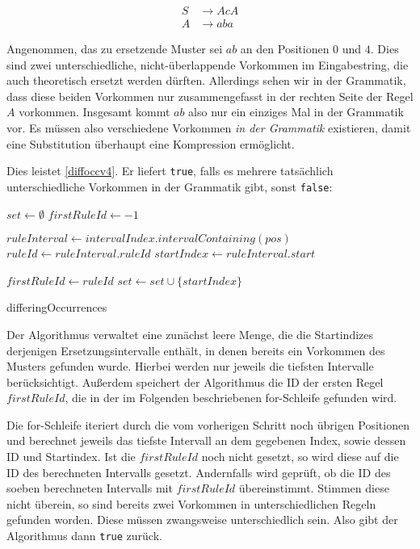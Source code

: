 \begin{align*}
    S &\rightarrow AcA\\
    A &\rightarrow aba
\end{align*}

Angenommen, das zu ersetzende Muster sei $ab$ an den Positionen $0$ und $4$. Dies sind zwei unterschiedliche, nicht-überlappende Vorkommen im Eingabestring, die auch theoretisch ersetzt werden dürften. Allerdings sehen wir in der Grammatik, dass diese beiden Vorkommen nur zusammengefasst in der rechten Seite der Regel $A$ vorkommen. Insgesamt kommt $ab$ also nur ein einziges Mal in der Grammatik vor. Es müssen also verschiedene Vorkommen \emph{in der Grammatik} existieren, damit eine Substitution überhaupt eine Kompression ermöglicht.

Dies leistet \autoref{diffoccv4}. Er liefert \texttt{true}, falls es mehrere tatsächlich unterschiedliche Vorkommen in der Grammatik gibt, sonst \texttt{false}:

\begin{algorithm}[t]
    $set \leftarrow \emptyset$\;
    $firstRuleId \leftarrow -1$\;
     {
         { 
            \KwContinue\;
        }
        $ruleInterval \leftarrow intervalIndex.intervalContaining(pos)$\;
        $ruleId \leftarrow ruleInterval.ruleId$\;
        $startIndex \leftarrow ruleInterval.start$\;

         {
            $firstRuleId \leftarrow ruleId$\;
        }
         {
        }
        $set \leftarrow set \cup \{startIndex\}$\;
    }
    
    \caption{differingOccurrences}
    \label{diffoccv4}
\end{algorithm}

Der Algorithmus verwaltet eine zunächst leere Menge, die die Startindizes derjenigen Ersetzungsintervalle enthält, in denen bereits ein Vorkommen des Musters gefunden wurde. Hierbei werden nur jeweils die tiefsten Intervalle berücksichtigt. Außerdem speichert der Algorithmus die ID der ersten Regel $firstRuleId$, die in der im Folgenden beschriebenen for-Schleife gefunden wird.

Die for-Schleife iteriert durch die vom vorherigen Schritt noch übrigen Positionen und berechnet jeweils das tiefste Intervall an dem gegebenen Index, sowie dessen ID und Startindex. Ist die $firstRuleId$ noch nicht gesetzt, so wird diese auf die ID des berechneten Intervalls gesetzt. Andernfalls wird geprüft, ob die ID des soeben berechneten Intervalls mit $firstRuleId$ übereinstimmt. Stimmen diese nicht überein, so sind bereits zwei Vorkommen in unterschiedlichen Regeln gefunden worden. Diese müssen zwangsweise unterschiedlich sein. Also gibt der Algorithmus dann \texttt{true} zurück.

